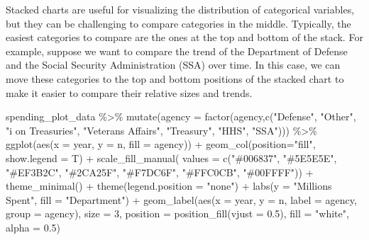 \documentclass[
  letterpaper,
]{book}
\newenvironment{Shaded}{\begin{snugshade}}{\end{snugshade}}
\newcommand{\AttributeTok}[1]{\textcolor[rgb]{0.40,0.45,0.13}{#1}}
\newcommand{\DecValTok}[1]{\textcolor[rgb]{0.68,0.00,0.00}{#1}}
\newcommand{\FloatTok}[1]{\textcolor[rgb]{0.68,0.00,0.00}{#1}}
\newcommand{\FunctionTok}[1]{\textcolor[rgb]{0.28,0.35,0.67}{#1}}
\newcommand{\NormalTok}[1]{\textcolor[rgb]{0.00,0.23,0.31}{#1}}
\newcommand{\SpecialCharTok}[1]{\textcolor[rgb]{0.37,0.37,0.37}{#1}}
\newcommand{\StringTok}[1]{\textcolor[rgb]{0.13,0.47,0.30}{#1}}
\begin{document}
Stacked charts are useful for visualizing the distribution of
categorical variables, but they can be challenging to compare categories
in the middle. Typically, the easiest categories to compare are the ones
at the top and bottom of the stack. For example, suppose we want to
compare the trend of the Department of Defense and the Social Security
Administration (SSA) over time. In this case, we can move these
categories to the top and bottom positions of the stacked chart to make
it easier to compare their relative sizes and trends.

\begin{Shaded}
\begin{Highlighting}[]
\NormalTok{spending\_plot\_data }\SpecialCharTok{\%\textgreater{}\%} \FunctionTok{mutate}\NormalTok{(}\AttributeTok{agency =} \FunctionTok{factor}\NormalTok{(agency,}\FunctionTok{c}\NormalTok{(}\StringTok{"Defense"}\NormalTok{, }\StringTok{"Other"}\NormalTok{, }\StringTok{"i on Treasuries"}\NormalTok{, }\StringTok{"Veterans Affairs"}\NormalTok{, }\StringTok{"Treasury"}\NormalTok{, }\StringTok{"HHS"}\NormalTok{, }\StringTok{"SSA"}\NormalTok{))) }\SpecialCharTok{\%\textgreater{}\%} 
  \FunctionTok{ggplot}\NormalTok{(}\FunctionTok{aes}\NormalTok{(}\AttributeTok{x =}\NormalTok{ year, }\AttributeTok{y =}\NormalTok{ n, }\AttributeTok{fill =}\NormalTok{ agency)) }\SpecialCharTok{+} 
  \FunctionTok{geom\_col}\NormalTok{(}\AttributeTok{position=}\StringTok{"fill"}\NormalTok{, }\AttributeTok{show.legend =}\NormalTok{ T) }\SpecialCharTok{+}
  \FunctionTok{scale\_fill\_manual}\NormalTok{( }
    \AttributeTok{values =} \FunctionTok{c}\NormalTok{(}\StringTok{"\#006837"}\NormalTok{, }\StringTok{"\#5E5E5E"}\NormalTok{, }\StringTok{"\#EF3B2C"}\NormalTok{, }\StringTok{"\#2CA25F"}\NormalTok{,  }\StringTok{"\#F7DC6F"}\NormalTok{, }\StringTok{"\#FFC0CB"}\NormalTok{, }\StringTok{"\#00FFFF"}\NormalTok{)) }\SpecialCharTok{+}
  \FunctionTok{theme\_minimal}\NormalTok{() }\SpecialCharTok{+} 
  \FunctionTok{theme}\NormalTok{(}\AttributeTok{legend.position =} \StringTok{"none"}\NormalTok{) }\SpecialCharTok{+} 
  \FunctionTok{labs}\NormalTok{(}\AttributeTok{y =} \StringTok{"Millions Spent"}\NormalTok{, }\AttributeTok{fill =} \StringTok{"Department"}\NormalTok{) }\SpecialCharTok{+}
  \FunctionTok{geom\_label}\NormalTok{(}\FunctionTok{aes}\NormalTok{(}\AttributeTok{x =}\NormalTok{ year, }\AttributeTok{y =}\NormalTok{ n, }\AttributeTok{label =}\NormalTok{ agency, }\AttributeTok{group =}\NormalTok{ agency), }\AttributeTok{size =} \DecValTok{3}\NormalTok{, }\AttributeTok{position =} \FunctionTok{position\_fill}\NormalTok{(}\AttributeTok{vjust =} \FloatTok{0.5}\NormalTok{), }\AttributeTok{fill =} \StringTok{"white"}\NormalTok{, }\AttributeTok{alpha =} \FloatTok{0.5}\NormalTok{)}
\end{Highlighting}
\end{Shaded}
\end{document}
